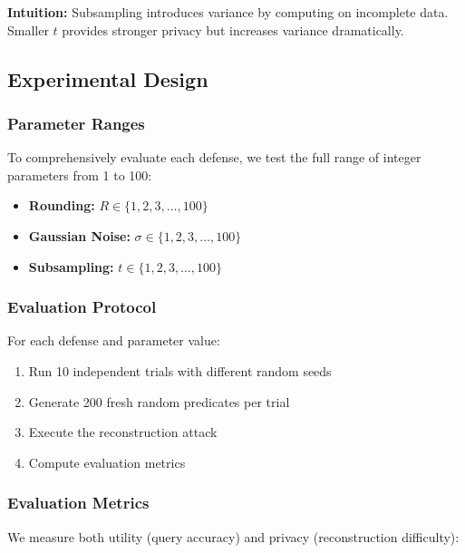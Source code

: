 \documentclass[11pt,letterpaper]{article}
\begin{document}
\textbf{Intuition:} Subsampling introduces variance by computing on incomplete data. Smaller $t$ provides stronger privacy but increases variance dramatically.

\subsection{Experimental Design}

\subsubsection{Parameter Ranges}

To comprehensively evaluate each defense, we test the full range of integer parameters from 1 to 100:

\begin{itemize}[leftmargin=*]
    \item \textbf{Rounding:} $R \in \{1, 2, 3, \ldots, 100\}$
    \item \textbf{Gaussian Noise:} $\sigma \in \{1, 2, 3, \ldots, 100\}$
    \item \textbf{Subsampling:} $t \in \{1, 2, 3, \ldots, 100\}$
\end{itemize}

\subsubsection{Evaluation Protocol}

For each defense and parameter value:

\begin{enumerate}[leftmargin=*]
    \item Run 10 independent trials with different random seeds
    \item Generate 200 fresh random predicates per trial
    \item Execute the reconstruction attack
    \item Compute evaluation metrics
\end{enumerate}

\subsubsection{Evaluation Metrics}

We measure both utility (query accuracy) and privacy (reconstruction difficulty):
\end{document}
